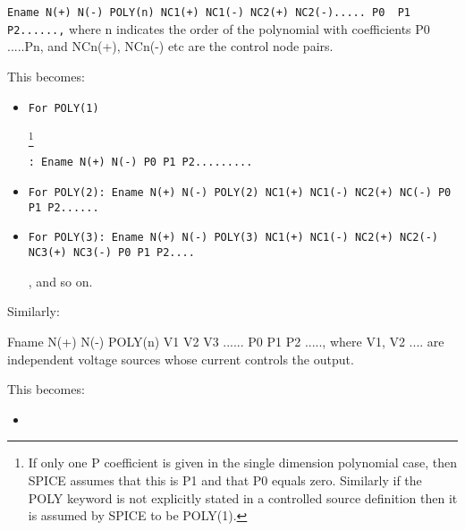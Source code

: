 \smallskip 

\verb|Ename N(+) N(-) POLY(n) NC1(+) NC1(-) NC2(+) NC2(-)..... P0  P1  P2......,| \linebreak where n indicates the order of the polynomial with coefficients P0 .....Pn, and NCn(+), NCn(-) etc are the control node pairs.
  
This becomes:
\begin{itemize}
 \item \begin{footnotesize}\verb|For POLY(1)|                         \end{footnotesize}\footnote{ If only one P coefficient is given in the single dimension polynomial case, then SPICE assumes that this is P1 and that P0 equals zero. Similarly if the POLY keyword is not explicitly stated in a controlled source definition then it is assumed by SPICE to be POLY(1).}\begin{footnotesize}\verb|: Ename N(+) N(-) P0 P1 P2.........|                                                                                                                                                                                                                                                                                                                                                          \end{footnotesize}
 \item \begin{footnotesize}\verb|For POLY(2): Ename N(+) N(-) POLY(2) NC1(+) NC1(-) NC2(+) NC(-) P0 P1 P2......|                                                                                            \end{footnotesize}
 \item \begin{footnotesize}\verb|For POLY(3): Ename N(+) N(-) POLY(3) NC1(+) NC1(-) NC2(+) NC2(-) NC3(+) NC3(-) P0 P1 P2....                                                                                              |\end{footnotesize}, and so on.
\end{itemize}            



Similarly:
\begin{footnotesize}Fname N(+) N(-) POLY(n) V1 V2 V3 ...... P0 P1 P2 ....., where V1, V2 .... are independent voltage sources whose current controls the output.
\end{footnotesize}
This becomes:
\begin{itemize}
 \item {}
\end{itemize}


